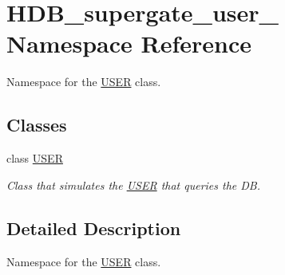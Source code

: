 \hypertarget{namespaceHDB__supergate__user__}{}\section{H\+D\+B\+\_\+supergate\+\_\+user\+\_\+ Namespace Reference}
\label{namespaceHDB__supergate__user__}


Namespace for the \hyperlink{classHDB__supergate__user___1_1USER}{U\+S\+ER} class.  


\subsection*{Classes}
\begin{DoxyCompactItemize}
\item 
class \hyperlink{classHDB__supergate__user___1_1USER}{U\+S\+ER}
\begin{DoxyCompactList}\small\item\em Class that simulates the \hyperlink{classHDB__supergate__user___1_1USER}{U\+S\+ER} that queries the DB. \end{DoxyCompactList}\end{DoxyCompactItemize}


\subsection{Detailed Description}
Namespace for the \hyperlink{classHDB__supergate__user___1_1USER}{U\+S\+ER} class. 